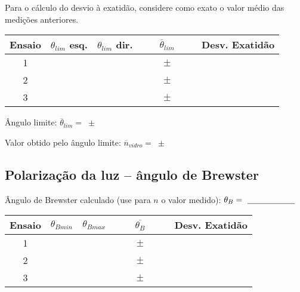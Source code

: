 \documentclass[a4paper,12pt]{article}  %
\begin{document}
Para o cálculo do desvio à exatidão, considere como exato o valor médio das medições anteriores.

\begin{center}
	\begin{tabular}{|c|c|c|c|c|}
	\hline
	 Ensaio   &  $\theta_{lim}$ esq.  & $\theta_{lim}$ dir.  &  $\overline{\theta}_{lim}$  & Desv. Exatidão \\
	\hline \hline
	 1 & & & $\qquad\pm\qquad$ & \\ \cline{1-5}
	 2 & & & $\qquad\pm\qquad$  & \\\cline{1-5}
	 3 & & & $\qquad\pm\qquad$  & \\
	  \hline
	\end{tabular}
\end{center}



Ângulo limite: $\overline{\theta}_{lim} =$~\underline{\makebox[2cm][r]{~}}$\pm$~\underline{\makebox[2cm][r]{~}}

Valor obtido pelo ângulo limite: $\overline{n}_{vidro} =$~\underline{\makebox[2cm][r]{~}}$\pm$~\underline{\makebox[2cm][r]{~}}




\subsection{\sf Polarização da luz -- ângulo de Brewster}\label{sec:dados_ar}

Ângulo de Brewster calculado (use para $n$ o valor medido): $\theta_B=~\underline{\makebox[2cm][r]{~}}$



\begin{center}
	\begin{tabular}{|c|c|c|c|c|}
	\hline \hline
	 Ensaio & $\theta_{Bmin} $ & $\theta_{Bmax} $ & $\overline{\theta_{B}} $  & Desv. Exatidão \\
	 \hline \hline
	 1 & & & $\qquad\pm\qquad$ & \\ \cline{1-5}
	 2 & & & $\qquad\pm\qquad$ & \\ \cline{1-5}
	 3 & & & $\qquad\pm\qquad$  & \\ \hline
			\end{tabular}
\end{center}
\end{document}
